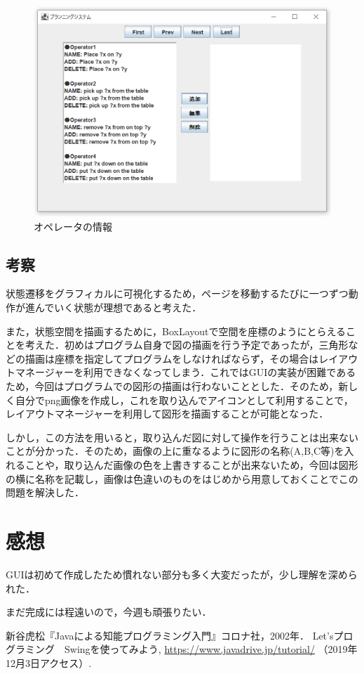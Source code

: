 \documentclass[12pt]{jarticle}
\begin{document}
\begin{figure}[htbp]
  \begin{center}
    \includegraphics[scale=0.6]{images/page7.PNG}
    \caption{オペレータの情報}
    \label{fig:page7}
  \end{center}
\end{figure}
\subsection{考察}
状態遷移をグラフィカルに可視化するため，ページを移動するたびに一つずつ動作が進んでいく状態が理想であると考えた．\par
また，状態空間を描画するために，BoxLayoutで空間を座標のようにとらえることを考えた．初めはプログラム自身で図の描画を行う予定であったが，三角形などの描画は座標を指定してプログラムをしなければならず，その場合はレイアウトマネージャーを利用できなくなってしまう．これではGUIの実装が困難であるため，今回はプログラムでの図形の描画は行わないこととした．そのため，新しく自分でpng画像を作成し，これを取り込んでアイコンとして利用することで，レイアウトマネージャーを利用して図形を描画することが可能となった．\par
しかし，この方法を用いると，取り込んだ図に対して操作を行うことは出来ないことが分かった．そのため，画像の上に重なるように図形の名称(A,B,C等)を入れることや，取り込んだ画像の色を上書きすることが出来ないため，今回は図形の横に名称を記載し，画像は色違いのものをはじめから用意しておくことでこの問題を解決した．



\section{感想}
GUIは初めて作成したため慣れない部分も多く大変だったが，少し理解を深められた．\par
まだ完成には程遠いので，今週も頑張りたい．

\begin{thebibliography}{99}
 新谷虎松『Javaによる知能プログラミング入門』コロナ社，2002年．
 Let'sプログラミング　Swingを使ってみよう, \url{https://www.javadrive.jp/tutorial/} （2019年12月3日アクセス）.
\end{thebibliography}
\end{document}
